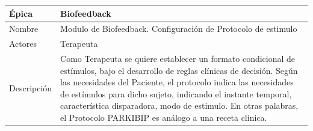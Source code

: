 \begin{table}[H] 
\centering
\begin{tabular}{| p{2cm} | p{10cm} |}
\hline
Épica & Biofeedback\\ \hline
Nombre & Modulo de Biofeedback. Configuración de Protocolo de estimulo\\ \hline
Actores & Terapeuta\\ \hline
Descripción &  Como Terapeuta se quiere establecer un formato condicional de estímulos, bajo el desarrollo de reglas clínicas de decisión. Según las necesidades del Paciente, el protocolo indica las necesidades de estímulos para dicho sujeto, indicando el instante temporal, característica disparadora, modo de estimulo. En otras palabras, el Protocolo PARKIBIP es análogo a una receta clínica. \\ \hline
\end{tabular}
\end{table}




